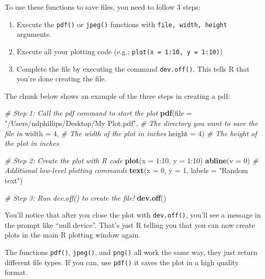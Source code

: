 \documentclass[]{book}
\newenvironment{Shaded}{\begin{snugshade}}{\end{snugshade}}
\newcommand{\KeywordTok}[1]{\textcolor[rgb]{0.13,0.29,0.53}{\textbf{{#1}}}}
\newcommand{\DataTypeTok}[1]{\textcolor[rgb]{0.13,0.29,0.53}{{#1}}}
\newcommand{\DecValTok}[1]{\textcolor[rgb]{0.00,0.00,0.81}{{#1}}}
\newcommand{\StringTok}[1]{\textcolor[rgb]{0.31,0.60,0.02}{{#1}}}
\newcommand{\CommentTok}[1]{\textcolor[rgb]{0.56,0.35,0.01}{\textit{{#1}}}}
\newcommand{\NormalTok}[1]{{#1}}
\providecommand{\tightlist}{%
  \setlength{\itemsep}{0pt}\setlength{\parskip}{0pt}}
\theoremstyle{definition}
\theoremstyle{definition}
\theoremstyle{remark}
\begin{document}
To use these functions to save files, you need to follow 3 steps:

\begin{enumerate}
\def\labelenumi{\arabic{enumi}.}
\tightlist
\item
  Execute the \texttt{pdf()} or \texttt{jpeg()} functions with
  \texttt{file,\ width,\ height} arguments.
\item
  Execute all your plotting code (e.g.;
  \texttt{plot(x\ =\ 1:10,\ y\ =\ 1:10)})
\item
  Complete the file by executing the command \texttt{dev.off()}. This
  tells R that you're done creating the file.
\end{enumerate}

The chunk below shows an example of the three steps in creating a pdf:

\begin{Shaded}
\begin{Highlighting}[]
\CommentTok{# Step 1: Call the pdf command to start the plot}
\KeywordTok{pdf}\NormalTok{(}\DataTypeTok{file =} \StringTok{"/Users/ndphillips/Desktop/My Plot.pdf"}\NormalTok{,   }\CommentTok{# The directory you want to save the file in}
    \DataTypeTok{width =} \DecValTok{4}\NormalTok{, }\CommentTok{# The width of the plot in inches}
    \DataTypeTok{height =} \DecValTok{4}\NormalTok{) }\CommentTok{# The height of the plot in inches}

\CommentTok{# Step 2: Create the plot with R code}
\KeywordTok{plot}\NormalTok{(}\DataTypeTok{x =} \DecValTok{1}\NormalTok{:}\DecValTok{10}\NormalTok{, }
     \DataTypeTok{y =} \DecValTok{1}\NormalTok{:}\DecValTok{10}\NormalTok{)}
\KeywordTok{abline}\NormalTok{(}\DataTypeTok{v =} \DecValTok{0}\NormalTok{) }\CommentTok{# Additional low-level plotting commands}
\KeywordTok{text}\NormalTok{(}\DataTypeTok{x =} \DecValTok{0}\NormalTok{, }\DataTypeTok{y =} \DecValTok{1}\NormalTok{, }\DataTypeTok{labels =} \StringTok{"Random text"}\NormalTok{)}

\CommentTok{# Step 3: Run dev.off() to create the file!}
\KeywordTok{dev.off}\NormalTok{()}
\end{Highlighting}
\end{Shaded}

You'll notice that after you close the plot with \texttt{dev.off()},
you'll see a message in the prompt like ``null device''. That's just R
telling you that you can now create plots in the main R plotting window
again.

The functions \texttt{pdf()}, \texttt{jpeg()}, and \texttt{png()} all
work the same way, they just return different file types. If you can,
use \texttt{pdf()} it saves the plot in a high quality format.
\end{document}

